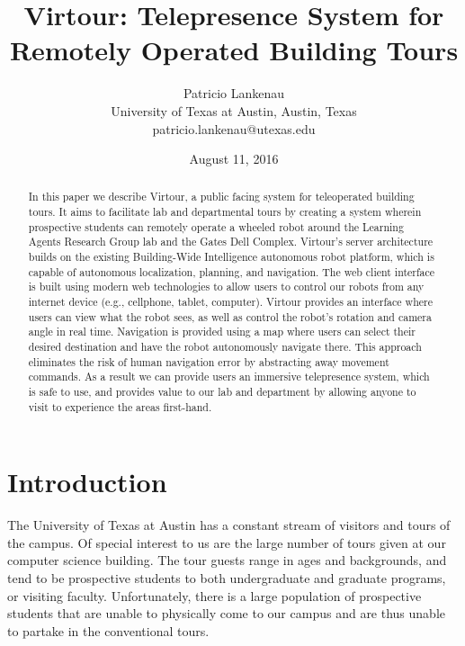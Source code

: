 \documentclass[
  oneside,
  11pt, a4paper,
  footinclude=true,
  headinclude=true,
  cleardoublepage=empty
]{article}
\title{Virtour: Telepresence System for Remotely Operated Building Tours}
\author{Patricio Lankenau\\
        University of Texas at Austin, Austin, Texas\\
        patricio.lankenau@utexas.edu\\}
\date{August 11, 2016}
\begin{document}
\maketitle

\begin{abstract}
  In this paper we describe Virtour, a public facing system for teleoperated
  building tours. It aims to facilitate lab and departmental tours by creating
  a system wherein prospective students can remotely operate a wheeled robot
  around the Learning Agents Research Group lab and the Gates Dell Complex.
  Virtour's server architecture builds on the existing Building-Wide
  Intelligence autonomous robot platform, which is capable of autonomous
  localization, planning, and navigation. The web client interface is built
  using modern web technologies to allow users to control our robots from any
  internet device (e.g., cellphone, tablet, computer). Virtour provides an
  interface where users can view what the robot sees, as well as control the
  robot's rotation and camera angle in real time. Navigation is provided using
  a map where users can select their desired destination and have the robot
  autonomously navigate there. This approach eliminates the risk of human
  navigation error by abstracting away movement commands. As a result we can
  provide users an immersive telepresence system, which is safe to use, and
  provides value to our lab and department by allowing anyone to visit to
  experience the areas first-hand.
\end{abstract}

\newpage

\section{Introduction}\label{sec:intro}

The University of Texas at Austin has a constant stream of visitors and tours
of the campus. Of special interest to us are the large number of tours given at
our computer science building. The tour guests range in ages and backgrounds,
and tend to be prospective students to both undergraduate and graduate programs,
or visiting faculty. Unfortunately, there is a large population of prospective
students that are unable to physically come to our campus and are thus unable
to partake in the conventional tours.
\end{document}
